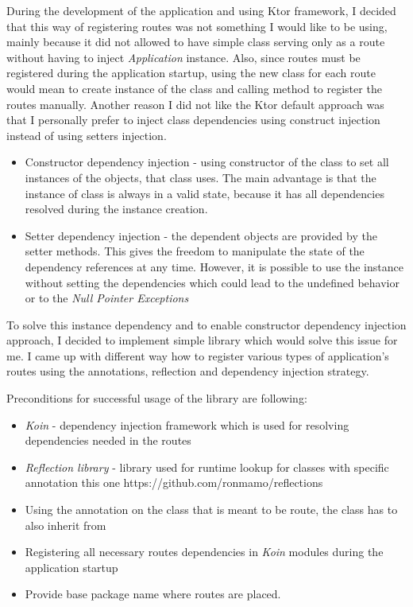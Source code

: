 During the development of the application and using Ktor framework, 
I decided that this way of registering routes was not something I would like to be using,
mainly because it did not allowed to have simple class serving only as a route without having to inject \textit{Application} instance.
Also, 
since routes must be registered during the application startup,
using the new class for each route would mean to create instance of the class and calling method to register the routes manually.
Another reason I did not like the Ktor default approach was 
that I personally prefer to inject class dependencies using construct injection instead of using setters injection.
\begin{itemize}
	\item Constructor dependency injection - using constructor of the class to set all instances of the objects, that class uses.
	      The main advantage is that the instance of class is always in a valid state, because it has all dependencies resolved during the instance creation.
	\item Setter dependency injection - the dependent objects are provided by the setter methods.
	      This gives the freedom to manipulate the state of the dependency references at any time.
	      However, it is possible to use the instance without setting the dependencies which could lead to the undefined behavior or to the \textit{Null Pointer Exceptions}
\end{itemize}

To solve this  instance dependency and to enable constructor dependency injection approach,
I decided to implement simple library which would solve this issue for me.
I came up with different way how to register various types of application's routes using the annotations, 
reflection and dependency injection strategy.

\medskip \noindent
Preconditions for successful usage of the library are following:
\begin{itemize}
	\item \textit{Koin} - dependency injection framework which is used for resolving dependencies needed in the routes
	\item \textit{Reflection library} - library used for runtime lookup for classes with specific annotation
	this one https://github.com/ronmamo/reflections 
	\item Using the  annotation on the class that is meant to be route,
	the class has to also inherit from 
	\item Registering all necessary routes dependencies in \textit{Koin} modules during the application startup
	\item Provide base package name where routes are placed.
\end{itemize}

